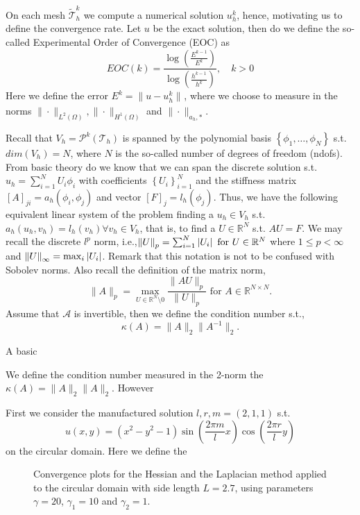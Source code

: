 On each mesh $\widetilde{\mathcal{T}}^{k}_{h}  $ we compute a numerical solution $u_{h}^{k}$, hence, motivating us to define the convergence rate. Let $u $ be the exact solution, then do we define the so-called Experimental Order of Convergence (EOC) as \[
EOC( k) =  \frac{\log \left(  \frac{E^{k-1}}{E^{k}} \right)}{\log \left(  \frac{h^{k-1}}{h^{k}} \right)}, \quad    k>0
\]
Here we define the error $E^{k} = \| u - u_{h}^{k} \|_{  }^{  } $, where we choose to measure in the norms $ \|\cdot   \|_{L^2( \Omega )   }^{  },   \|\cdot   \|_{H^1( \Omega )   }^{  } $ and $ \|\cdot   \|_{ a_{h},* }^{  }$.

Recall that $V_{h} = \mathcal{P} ^{k}( \mathcal{T} _{h}) $ is spanned by the polynomial basis $\left\{ \phi _{1}, \ldots, \phi _{N}  \right\} $ s.t. $dim(V_{h}) = N$, where $N$ is the so-called number of degrees of freedom (ndofs). From basic theory
do we know that we can span the discrete solution s.t.
$u_{h} = \sum_{i=1}^{N}  U_{i} \phi_{i} $ with coefficients $\left\{
U_{i}\right\} _{i=1}^{N}$ and the stiffness matrix $\left[ A  \right] _{ji} = a_{h}( \phi _{i}, \phi _{j}) $ and vector $\left[ F \right] _{j} = l_{h}( \phi_{j} ) $. Thus, we have the following equivalent linear system of the problem finding a $u_{h} \in  V_{h}$ s.t.
$a_{h}( u_{h},v_{h})  = l_{h}( v_{h}) \forall v_{h} \in V_{h}$, that is, to find a $U \in \mathbb{R} ^{N}$ s.t. $AU =F$. We may recall the discrete $l^{p}$ norm, i.e.,\(
    \| U  \|_{ p }^{  } = \sum_{i=1}^{N}  \left\lvert  U_{i}   \right\rvert \text{ for } U \in \mathbb{R} ^{N}
\)
where $1\le p < \infty$ and $\| U \|_{ \infty }^{  }  = \max_{i}  \left\lvert  U_i  \right\rvert $.
Remark that this notation is not to be confused with Sobolev norms.
Also recall the definition of the matrix norm, \[
\| A  \|_{p  }^{  }  = \max_{U \in \mathbb{R} ^{N} \setminus 0} \frac{\| AU \|_{ p }^{  } }{\| U \|_{p}^{  } } \text{ for } A \in \mathbb{R} ^{N\times N}.
\]
Assume that $\mathcal{A} $ is invertible, then we define the condition number s.t., \[
\kappa ( A) = \| A  \|_{ 2 }^{  } \| A ^{-1} \|_{ 2 }  .
\]

A basic

We define the condition number measured in the 2-norm the $\kappa( A) =  \| A \|_{ 2 }^{  } \| A \|_{2  }^{  }   $. However

First we consider the manufactured solution $l,r,m = (2, 1, 1) $ s.t.
\[
u(x,y) = (x^2- y^2 -1) \sin\left(\frac{2\pi m}{l}x\right)\cos\left(\frac{2\pi r}{l}y\right)
\]
on the circular domain. Here we define the

\begin{figure}[h!]
\centering
\subfloat[Hessian]{}

\bigskip

\subfloat[Laplace]{}

\caption{ Convergence plots for the Hessian and the Laplacian method applied to the circular domain with side length $L=2.7$, using parameters $\gamma=20$, $\gamma_1=10$ and $\gamma_2=1$.}
\end{figure}



